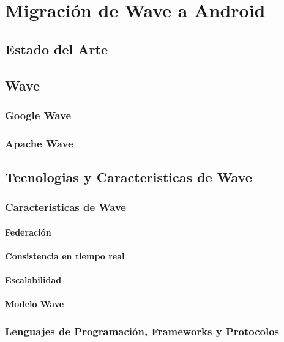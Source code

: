\newpage
\thispagestyle{sectioned}
\chapter{Migración de Wave a Android}

\section{Estado del Arte}

\section{Wave}
  
  \subsection{Google Wave}

  \subsection{Apache Wave}

\section{Tecnologias y Caracteristicas de Wave}
  
  \subsection{Caracteristicas de Wave}
    \subsubsection{Federación}
    \subsubsection{Consistencia en tiempo real}
    \subsubsection{Escalabilidad}
    \subsubsection{Modelo Wave}
    
  \subsection{Lenguajes de Programación, Frameworks y Protocolos}
  
